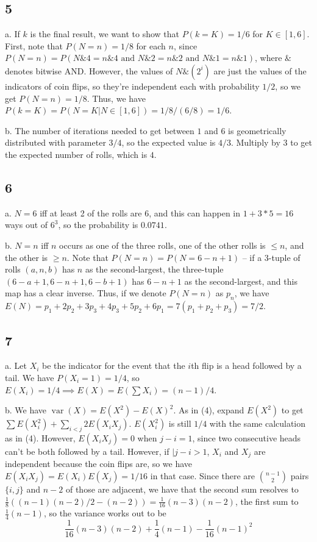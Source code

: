 \documentclass{article}
\DeclareMathOperator{\var}{var}
\begin{document}
\subsection*{5}
a. If $k$ is the final result, we want to show that $P(k=K)=1/6$ for $K\in[1,6]$. First, note that $P(N=n)=1/8$ for each $n$, since $P(N=n)=P(N\&4=n\&4\text{ and }N\&2=n\&2\text{ and }N\&1=n\&1)$, where $\&$ denotes bitwise AND. However, the values of $N\&(2^i)$ are just the values of the indicators of coin flips, so they're independent each with probability $1/2$, so we get $P(N=n)=1/8$. Thus, we have $P(k=K)=P(N=K|N\in[1,6])=1/8/(6/8)=1/6$.

b. The number of iterations needed to get between $1$ and $6$ is geometrically distributed with parameter $3/4$, so the expected value is $4/3$. Multiply by $3$ to get the expected number of rolls, which is $4$.
\subsection*{6}
a. $N=6$ iff at least 2 of the rolls are $6$, and this can happen in $1+3*5=16$ ways out of $6^3$, so the probability is $0.0741$.

b. $N=n$ iff $n$ occurs as one of the three rolls, one of the other rolls is $\leq n$, and the other is $\geq n$. Note that $P(N=n)=P(N=6-n+1)$ -- if a 3-tuple of rolls $(a,n,b)$ has $n$ as the second-largest, the three-tuple $(6-a+1,6-n+1,6-b+1)$ has $6-n+1$ as the second-largest, and this map has a clear inverse. Thus, if we denote $P(N=n)$ as $p_n$, we have $E(N)=p_1+2p_2+3p_3+4p_3+5p_2+6p_1=7(p_1+p_2+p_3)=7/2$.
\subsection*{7}
a. Let $X_i$ be the indicator for the event that the $i$th flip is a head followed by a tail. We have $P(X_i=1)=1/4$, so $E(X_i)=1/4\implies E(X)=E(\sum X_i)=(n-1)/4$.

b. We have $\var(X)=E(X^2)-E(X)^2$. As in (4), expand $E(X^2)$ to get $\sum E(X_i^2)+\sum_{i<j}2E(X_iX_j)$. $E(X_i^2)$ is still $1/4$ with the same calculation as in (4). However, $E(X_iX_j)=0$ when $j-i=1$, since two consecutive heads can't be both followed by a tail. However, if $|j-i>1$, $X_i$ and $X_j$ are independent because the coin flips are, so we have $E(X_iX_j)=E(X_i)E(X_j)=1/16$ in that case. Since there are $\binom{n-1}{2}$ pairs $\{i,j\}$ and $n-2$ of those are adjacent, we have that the second sum resolves to $\frac{1}{8}((n-1)(n-2)/2-(n-2))=\frac{1}{16}(n-3)(n-2)$, the first sum to $\frac{1}{4}(n-1)$, so the variance works out to be 
$$\frac{1}{16}(n-3)(n-2)+\frac{1}{4}(n-1)-\frac{1}{16}(n-1)^2$$
\end{document}
